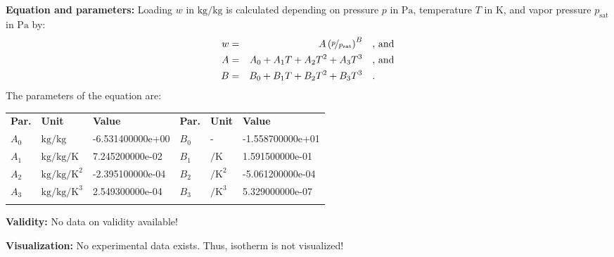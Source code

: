 \textbf{Equation and parameters:}
\newline
%
Loading $w$ in $\si{\kilogram\per\kilogram}$ is calculated depending on pressure $p$ in $\si{\pascal}$, temperature $T$ in $\si{\kelvin}$, and vapor pressure $p_\mathrm{sat}$ in $\si{\pascal}$ by:
%
\begin{equation*}
\begin{split}
w &=& A \left( \nicefrac{p}{p_\mathrm{sat}} \right) ^{B} & \quad\text{, and} \\
A &=& A_0 + A_1 T + A_2 T^2 + A_3 T^3 & \quad\text{, and} \\
B &=& B_0 + B_1 T + B_2 T^2 + B_3 T^3 & \quad\text{.} \\
\end{split}
\end{equation*}
%
The parameters of the equation are:
%
\begin{longtable}[l]{lll|lll}
\toprule
\addlinespace
\textbf{Par.} & \textbf{Unit} & \textbf{Value} &	\textbf{Par.} & \textbf{Unit} & \textbf{Value} \\
\addlinespace
\midrule
\endhead

\bottomrule
\endfoot
\bottomrule
\endlastfoot
\addlinespace

$A_0$ & $\si{\kilogram\per\kilogram}$ & -6.531400000e+00 & $B_0$ & - & -1.558700000e+01 \\
$A_1$ & $\si{\kilogram\per\kilogram\per\kelvin}$ & 7.245200000e-02 & $B_1$ & $\si{\per\kelvin}$ & 1.591500000e-01 \\
$A_2$ & $\si{\kilogram\per\kilogram\per\square\kelvin}$ & -2.395100000e-04 & $B_2$ & $\si{\per\square\kelvin}$ & -5.061200000e-04 \\
$A_3$ & $\si{\kilogram\per\kilogram\per\cubic\kelvin}$ & 2.549300000e-04 & $B_3$ & $\si{\per\cubic\kelvin}$ & 5.329000000e-07 \\

\addlinespace\end{longtable}

\textbf{Validity:}
\newline
No data on validity available!
\newline

\textbf{Visualization:}
%
\newline
No experimental data exists. Thus, isotherm is not visualized!
%

\FloatBarrier
\newpage
